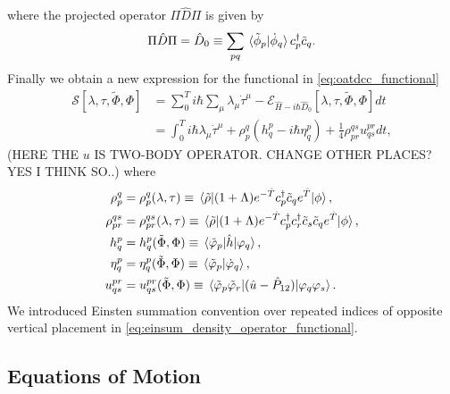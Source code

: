where the projected operator $\Pi\hat{D}\Pi$ is given by 
\begin{equation}
    \Pi\hat{D}\Pi = \hat{D}_0 
    \equiv 
    \sum_{pq}\braket*{\tilde{\phi}_p}{\dot{\phi}_q}c^\dagger_p \tilde{c}_q.
\end{equation}
Finally we obtain a new expression for the functional in \autoref{eq:oatdcc_functional}
\begin{align}
    \label{eq:oatdcc_functional_final}
    \mathcal{S}[\lambda, \tau, \tilde{\Phi}, \Phi] 
    &= \sum_0^T 
    i\hbar\sum_\mu \lambda_\mu \dot{\tau}^\mu 
    - \mathcal{E}_{\hat{H} - i \hbar\hat{D}_0}[\lambda, \tau, \tilde{\Phi}, \Phi] dt \\
    \label{eq:einsum_density_operator_functional}  
    &= \int_0^T i\hbar \lambda_\mu \dot{\tau}^\mu 
    + \rho^q_p (h^p_q - i\hbar\eta^p_q) + \frac{1}{4}\rho^{qs}_{pr} u^{pr}_{qs}dt,
\end{align}
(HERE THE $u$ IS TWO-BODY OPERATOR. CHANGE OTHER PLACES? YES I THINK SO..) where
\begin{align} 
    \rho^q_p &= \rho^q_p(\lambda, \tau) 
    \equiv \mel{\tilde{\rho}}
    {(1 + \Lambda)e^{-\hat{T}}c^\dagger_p \tilde{c}_q e^{\hat{T}}}
    {\phi}, \\
    \rho^{qs}_{pr} &= \rho^{qs}_{pr}(\lambda, \tau) 
    \equiv \mel{\tilde{\rho}}
    {(1 + \Lambda)e^{-\hat{T}} c^\dagger_p c^\dagger_r \tilde{c}_s \tilde{c}_q e^{\hat{T}}}
    {\phi}, \\
    h^p_q &= h^p_q(\tilde{\Phi}, \Phi)
    \equiv \mel{\tilde{\varphi}_p}{\hat{h}}{\varphi_q}, \\
    \eta^p_q &= \eta^p_q(\tilde{\Phi}, \Phi)
    \equiv \braket*{\tilde{\varphi}_p}{\dot{\varphi}_q}, \\
    u^{pr}_{qs} &= u^{pr}_{qs}(\tilde{\Phi}, \Phi)
    \equiv \mel{\tilde{\varphi}_p\tilde{\varphi}_r}
    {(\hat{u} - \hat{P}_{12})}
    {\varphi_q \varphi_s}.
\end{align}
We introduced Einsten summation convention over repeated indices of opposite vertical 
placement in \autoref{eq:einsum_density_operator_functional}.

\subsection{Equations of Motion}

